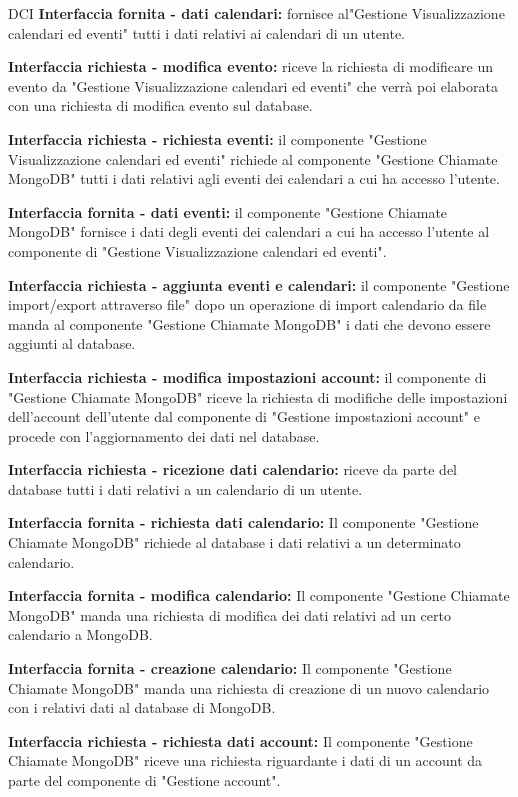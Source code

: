 \begin{listaPersonale}{DCI}
    \textbf{Interfaccia fornita - dati calendari:} fornisce al"Gestione Visualizzazione calendari ed eventi" tutti i dati relativi ai calendari di un utente.

    \textbf{Interfaccia richiesta - modifica evento:} riceve la richiesta di modificare un evento da  "Gestione Visualizzazione calendari ed eventi" che verrà poi elaborata con una richiesta di modifica evento sul database.

    \textbf{Interfaccia richiesta - richiesta eventi:} il componente "Gestione Visualizzazione calendari ed eventi" richiede al componente "Gestione Chiamate MongoDB" tutti i dati relativi agli eventi dei calendari a cui ha accesso l'utente.

    \textbf{Interfaccia fornita - dati eventi:} il componente "Gestione Chiamate MongoDB" fornisce i dati degli eventi dei calendari a cui ha accesso l'utente al componente di "Gestione Visualizzazione calendari ed eventi".

    \textbf{Interfaccia richiesta - aggiunta eventi e calendari:} il componente "Gestione import/export attraverso file" dopo un operazione di import calendario da file manda al componente "Gestione Chiamate MongoDB" i dati che devono essere aggiunti al database.

    \textbf{Interfaccia richiesta - modifica impostazioni account:} il componente di "Gestione Chiamate MongoDB" riceve la richiesta di modifiche delle impostazioni dell'account dell'utente dal componente di "Gestione impostazioni account" e procede con l'aggiornamento dei dati nel database.

    \textbf{Interfaccia richiesta - ricezione dati calendario:} riceve da parte del database tutti i dati relativi a un calendario di un utente.

    \textbf{Interfaccia fornita - richiesta dati calendario:} Il componente "Gestione Chiamate MongoDB" richiede al database i dati relativi a un determinato calendario.

    \textbf{Interfaccia fornita - modifica calendario:} Il componente "Gestione Chiamate MongoDB" manda una richiesta di modifica dei dati relativi ad un certo calendario a MongoDB.

    \textbf{Interfaccia fornita - creazione calendario:} Il componente "Gestione Chiamate MongoDB" manda una richiesta di creazione di un nuovo calendario con i relativi dati al database di MongoDB.

    \textbf{Interfaccia richiesta - richiesta dati account:} Il componente "Gestione Chiamate MongoDB" riceve una richiesta riguardante i dati di un account da parte del componente di "Gestione account".


\end{listaPersonale}

